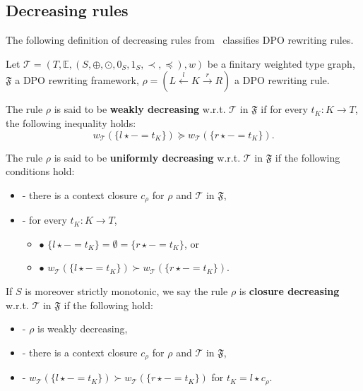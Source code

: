 \subsection{Decreasing rules}
\label{sec:decreasing_rules}
The following definition of decreasing rules from~\cite{endrullis2024generalized_arxiv_v2} classifies DPO rewriting rules.

\begin{definition}
    \label{wf:def:decreasing_rule}
    Let $\mathcal{T} = (T,\mathbb{E}, (S, \oplus, \odot, 0_S, 1_S, \prec, \preceq),w)$ be a finitary weighted type graph, \(\mathfrak{F}\) a DPO rewriting framework, $\rho = (L \overset{l}{\leftarrow} K \overset{r}{\rightarrow} R)$ a DPO rewriting rule.

    \noindent
    The rule $\rho$ is said to be \textbf{weakly decreasing} w.r.t. $\mathcal{T}$ in $\mathfrak{F}$ if 
            for every $t_K : K \to T$, the following inequality holds:
                $$ 
                  w_\mathcal{T}(\{l \star - = t_K\}) \succeq w_\mathcal{T}(\{r\star - = t_K\}).$$
           
    \noindent
    The rule $\rho$ is said to be \textbf{uniformly decreasing} w.r.t. $\mathcal{T}$ in $\mathfrak{F}$ if the following conditions hold:
        \begin{itemize}
            \item[]- there is a context closure $c_\rho$ for $\rho$ and $\mathcal{T}$ in $\mathfrak{F}$, 
            \item[]- for every $t_K : K \to T$,
            \begin{itemize}
                \item[] $\bullet$ $\{l \star - = t_K\} = \emptyset = \{r \star - = t_K\}$, or
                \item[] $\bullet$ $w_\mathcal{T}(\{l \star - = t_K\}) 
                        \succ   w_\mathcal{T}(\{r \star - = t_K\}) $.
            \end{itemize}
        \end{itemize}  
         
    \noindent
   If $S$ is moreover strictly monotonic, we say the rule $\rho$ is
            \textbf{closure decreasing} w.r.t. $\mathcal{T}$ in $\mathfrak{F}$ if the following hold:
            \begin{itemize}
                \item[]- $\rho$ is weakly decreasing,
                \item[]- there is a context closure $c_\rho$ for $\rho$ and $\mathcal{T}$ in $\mathfrak{F}$,
                \item[]- $w_\mathcal{T}(\{l \star - = t_K\})  
                \succ  w_\mathcal{T}(\{r \star - = t_K\})$ for $t_K = l \star c_\rho$.
            \end{itemize}
\end{definition}

